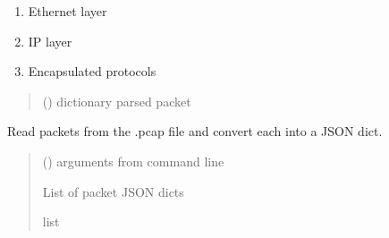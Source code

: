 \documentclass[letterpaper,10pt,english]{sphinxmanual}
\begin{document}
\begin{fulllineitems}
\label{\detokenize{pktsniffer:pktsniffer.print_packet}}
\pysigstartsignatures
\pysiglinewithargsret
{}
{}
{}
\pysigstopsignatures\begin{description}
\begin{enumerate}
%
\item {} 
\sphinxAtStartPar
Ethernet layer

\item {} 
\sphinxAtStartPar
IP layer

\item {} 
\sphinxAtStartPar
Encapsulated protocols

\end{enumerate}

\end{description}
\begin{quote}\begin{description}
\sphinxAtStartPar
{} () \textendash{} dictionary parsed packet

\end{description}\end{quote}

\end{fulllineitems}


\begin{fulllineitems}
\label{\detokenize{pktsniffer:pktsniffer.read_file}}
\pysigstartsignatures
\pysiglinewithargsret
{}
{}
{}
\pysigstopsignatures
\sphinxAtStartPar
Read packets from the .pcap file and convert each into a JSON dict.
\begin{quote}\begin{description}
\sphinxAtStartPar
{} () \textendash{} arguments from command line

\sphinxAtStartPar
List of packet JSON dicts

\sphinxAtStartPar
list

\end{description}\end{quote}

\end{fulllineitems}
\end{document}
